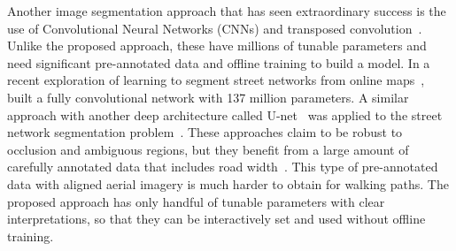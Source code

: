 Another image segmentation approach that has seen extraordinary success is the use of Convolutional Neural Networks (CNNs) and transposed convolution~\cite{Badrinarayanan2017-il, Noh2015-ni, Shelhamer2017-rf, Ronneberger2015-sv}. 
Unlike the proposed approach, these have millions of tunable parameters and need significant pre-annotated data and offline training to build a model. 
In a recent exploration of learning to segment street networks from online maps~\cite{Kaiser2017-np}, built a fully convolutional network with 137 million parameters.
A similar approach with another deep architecture called U-net~\cite{Ronneberger2015-sv} was applied to the street network segmentation problem~\cite{Zhang2017-gi}.
These approaches claim to be robust to occlusion and ambiguous regions, but they benefit from a large amount of carefully annotated data that includes road width~\cite{Mnih2013-dp}. 
This type of pre-annotated data with aligned aerial imagery is much harder to obtain for walking paths. 
The proposed approach has only handful of tunable parameters with clear interpretations, so that they can be interactively set and used without offline training.


